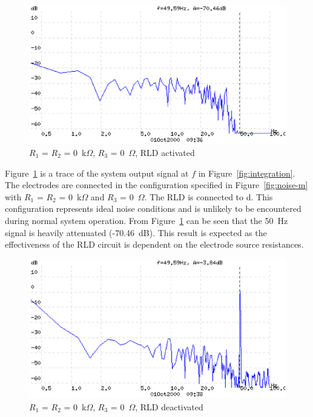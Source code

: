 \begin{figure}[htbp]
\begin{center}
	\includegraphics[width=\textwidth]{N5RLD.ps}
    \caption{$R_1$ = $R_2$ = 0~k$\Omega$, $R_3$ = 0~$\Omega$, RLD activated}
    \label{fig:N5RLD1}
\end{center}
\end{figure}

Figure~\ref{fig:N5RLD1} is a trace of the system output signal at $f$
in Figure~\ref{fig:integration}. The electrodes are connected in the
configuration specified in Figure~\ref{fig:noise-m} with $R_1$ = $R_2$
= 0~k$\Omega$ and $R_3$ = 0~$\Omega$. The RLD is connected to d. This
configuration represents ideal noise conditions and is unlikely to be
encountered during normal system operation. From
Figure~\ref{fig:N5RLD1} can be seen that the 50~Hz signal is heavily
attenuated (-70.46~dB). This result is expected as the effectiveness
of the RLD circuit is dependent on the electrode source resistances.


\begin{figure}[htbp]
\begin{center}
	\includegraphics[width=\textwidth]{N6NRLD.ps} \caption{$R_1$ =
    $R_2$ = 0~k$\Omega$, $R_3$ = 0~$\Omega$, RLD deactivated}
    \label{fig:N6RLD1}
\end{center}
\end{figure}


